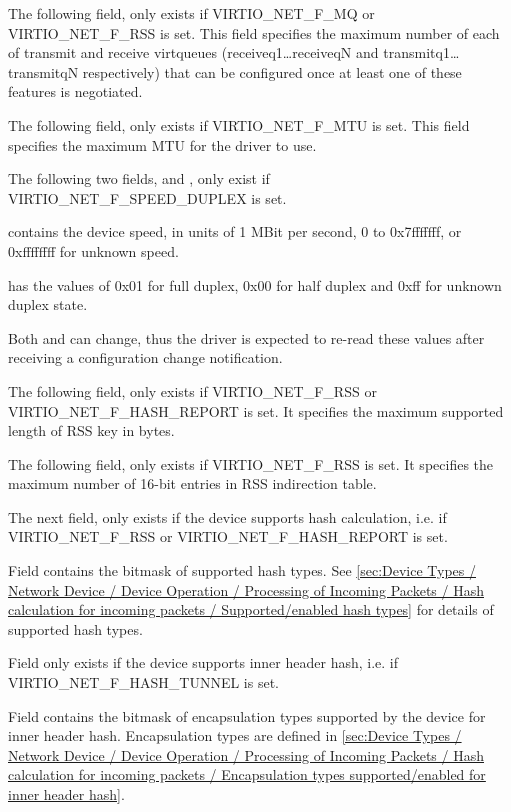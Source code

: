 The following field,  only exists if
VIRTIO_NET_F_MQ or VIRTIO_NET_F_RSS is set. This field specifies the maximum number
of each of transmit and receive virtqueues (receiveq1\ldots receiveqN
and transmitq1\ldots transmitqN respectively) that can be configured once at least one of these features
is negotiated.

The following field,  only exists if VIRTIO_NET_F_MTU
is set. This field specifies the maximum MTU for the driver to
use.

The following two fields,  and , only
exist if VIRTIO_NET_F_SPEED_DUPLEX is set.

 contains the device speed, in units of 1 MBit per
second, 0 to 0x7fffffff, or 0xffffffff for unknown speed.

 has the values of 0x01 for full duplex, 0x00 for
half duplex and 0xff for unknown duplex state.

Both  and  can change, thus the driver
is expected to re-read these values after receiving a
configuration change notification.

The following field,  only exists if VIRTIO_NET_F_RSS or VIRTIO_NET_F_HASH_REPORT is set.
It specifies the maximum supported length of RSS key in bytes.

The following field,  only exists if VIRTIO_NET_F_RSS is set.
It specifies the maximum number of 16-bit entries in RSS indirection table.

The next field,  only exists if the device supports hash calculation,
i.e. if VIRTIO_NET_F_RSS or VIRTIO_NET_F_HASH_REPORT is set.

Field  contains the bitmask of supported hash types.
See \ref{sec:Device Types / Network Device / Device Operation / Processing of Incoming Packets / Hash calculation for incoming packets / Supported/enabled hash types} for details of supported hash types.

Field  only exists if the device supports inner header hash, i.e. if VIRTIO_NET_F_HASH_TUNNEL is set.

Field  contains the bitmask of encapsulation types supported by the device for inner header hash.
Encapsulation types are defined in \ref{sec:Device Types / Network Device / Device Operation / Processing of Incoming Packets /
Hash calculation for incoming packets / Encapsulation types supported/enabled for inner header hash}.


